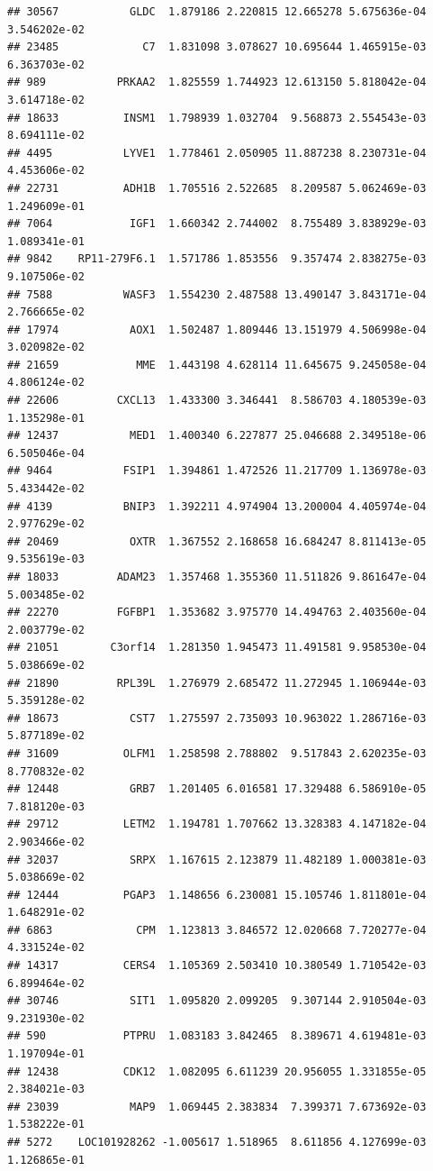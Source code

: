 \documentclass[
]{article}
\begin{document}
\begin{verbatim}
## 30567           GLDC  1.879186 2.220815 12.665278 5.675636e-04 3.546202e-02
## 23485             C7  1.831098 3.078627 10.695644 1.465915e-03 6.363703e-02
## 989           PRKAA2  1.825559 1.744923 12.613150 5.818042e-04 3.614718e-02
## 18633          INSM1  1.798939 1.032704  9.568873 2.554543e-03 8.694111e-02
## 4495           LYVE1  1.778461 2.050905 11.887238 8.230731e-04 4.453606e-02
## 22731          ADH1B  1.705516 2.522685  8.209587 5.062469e-03 1.249609e-01
## 7064            IGF1  1.660342 2.744002  8.755489 3.838929e-03 1.089341e-01
## 9842    RP11-279F6.1  1.571786 1.853556  9.357474 2.838275e-03 9.107506e-02
## 7588           WASF3  1.554230 2.487588 13.490147 3.843171e-04 2.766665e-02
## 17974           AOX1  1.502487 1.809446 13.151979 4.506998e-04 3.020982e-02
## 21659            MME  1.443198 4.628114 11.645675 9.245058e-04 4.806124e-02
## 22606         CXCL13  1.433300 3.346441  8.586703 4.180539e-03 1.135298e-01
## 12437           MED1  1.400340 6.227877 25.046688 2.349518e-06 6.505046e-04
## 9464           FSIP1  1.394861 1.472526 11.217709 1.136978e-03 5.433442e-02
## 4139           BNIP3  1.392211 4.974904 13.200004 4.405974e-04 2.977629e-02
## 20469           OXTR  1.367552 2.168658 16.684247 8.811413e-05 9.535619e-03
## 18033         ADAM23  1.357468 1.355360 11.511826 9.861647e-04 5.003485e-02
## 22270         FGFBP1  1.353682 3.975770 14.494763 2.403560e-04 2.003779e-02
## 21051        C3orf14  1.281350 1.945473 11.491581 9.958530e-04 5.038669e-02
## 21890         RPL39L  1.276979 2.685472 11.272945 1.106944e-03 5.359128e-02
## 18673           CST7  1.275597 2.735093 10.963022 1.286716e-03 5.877189e-02
## 31609          OLFM1  1.258598 2.788802  9.517843 2.620235e-03 8.770832e-02
## 12448           GRB7  1.201405 6.016581 17.329488 6.586910e-05 7.818120e-03
## 29712          LETM2  1.194781 1.707662 13.328383 4.147182e-04 2.903466e-02
## 32037           SRPX  1.167615 2.123879 11.482189 1.000381e-03 5.038669e-02
## 12444          PGAP3  1.148656 6.230081 15.105746 1.811801e-04 1.648291e-02
## 6863             CPM  1.123813 3.846572 12.020668 7.720277e-04 4.331524e-02
## 14317          CERS4  1.105369 2.503410 10.380549 1.710542e-03 6.899464e-02
## 30746           SIT1  1.095820 2.099205  9.307144 2.910504e-03 9.231930e-02
## 590            PTPRU  1.083183 3.842465  8.389671 4.619481e-03 1.197094e-01
## 12438          CDK12  1.082095 6.611239 20.956055 1.331855e-05 2.384021e-03
## 23039           MAP9  1.069445 2.383834  7.399371 7.673692e-03 1.538222e-01
## 5272    LOC101928262 -1.005617 1.518965  8.611856 4.127699e-03 1.126865e-01

\end{verbatim}
\end{document}
